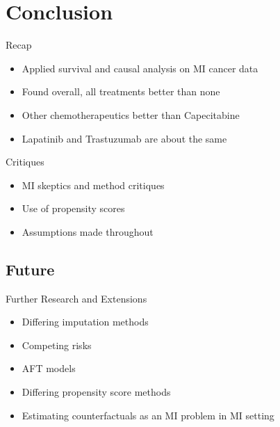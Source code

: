 \section{Conclusion}

\begin{frame}{Recap}
 \begin{itemize}
  \item Applied survival and causal analysis on MI cancer data
  \item Found overall, all treatments better than none
  \item Other chemotherapeutics better than Capecitabine
  \item Lapatinib and Trastuzumab are about the same
 \end{itemize}

\end{frame}


\begin{frame}{Critiques}
 \begin{itemize}
  \item MI skeptics and method critiques
  \item Use of propensity scores
  \item Assumptions made throughout
  \end{itemize}

\end{frame}

\subsection{Future}
\begin{frame}{Further Research and Extensions}

\begin{itemize}
 \item Differing imputation methods
 \item Competing risks
 \item AFT models
 \item Differing propensity score methods
 \item Estimating counterfactuals as an MI problem in MI setting
 
\end{itemize}

 
\end{frame}

